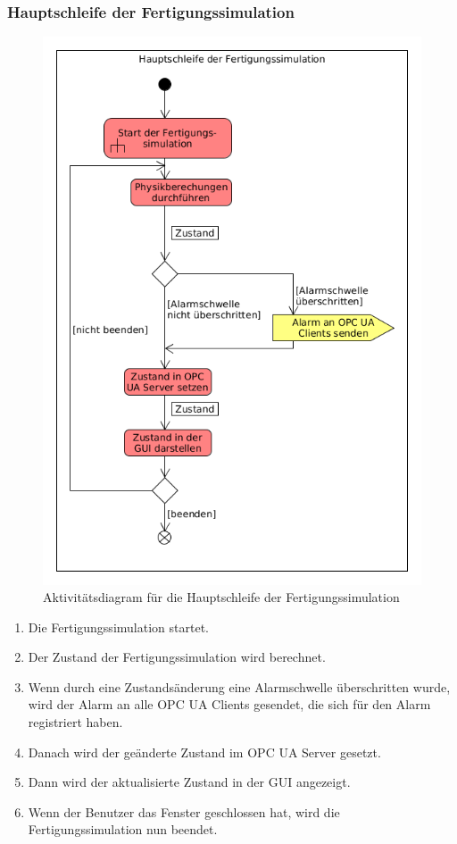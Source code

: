 \documentclass[parskip=full]{scrartcl}
\begin{document}
\subsubsection{Hauptschleife der Fertigungssimulation}
\begin{figure}[H]
  \centering
  \includegraphics[scale=0.62]{media/Activities/main-simulation.png}
  \caption{Aktivitätsdiagram für die Hauptschleife der Fertigungssimulation}
\end{figure}

\begin{enumerate}[noitemsep]
 \item Die \gls{Fertigungssimulation} startet.
 \item Der Zustand der \gls{Fertigungssimulation} wird berechnet.
 \item Wenn durch eine Zustandsänderung eine Alarmschwelle überschritten wurde, wird der Alarm an alle \glspl{OPC UA Client} gesendet,
 die sich für den Alarm registriert haben.
 \item Danach wird der geänderte Zustand im \gls{OPC UA Server} gesetzt.
 \item Dann wird der aktualisierte Zustand in der \gls{GUI} angezeigt.
 \item Wenn der Benutzer das Fenster geschlossen hat, wird die \gls{Fertigungssimulation} nun beendet.
\end{enumerate}
\end{document}

